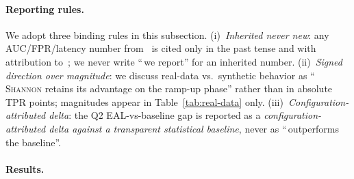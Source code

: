 \documentclass[runningheads]{llncs}
\begin{document}
\paragraph{Reporting rules.} We adopt three binding rules in this
subsection. (i)~\emph{Inherited never new}: any AUC/FPR/latency number
from~\cite{paper3} is cited only in the past tense and with attribution
to~\cite{paper3}; we never write ``\,we report'' for an inherited
number. (ii)~\emph{Signed direction over magnitude}: we discuss
real-data vs.\ synthetic behavior as
``\,\textsc{Shannon} retains its advantage on the ramp-up phase'' rather
than in absolute TPR points; magnitudes appear in
Table~\ref{tab:real-data} only. (iii)~\emph{Configuration-attributed
delta}: the Q2 EAL-vs-baseline gap is reported as a
\emph{configuration-attributed delta against a transparent statistical
baseline}, never as ``\,outperforms the baseline''.

\paragraph{Results.}
\begin{table}[t]
\centering
\caption{Real-data evaluation on the CIC-IDS2017-aligned proxy stream.
Each row is one $(E, W, s)$ EAL configuration or one z-score baseline
feature. Detection delay is measured from the first attack-labelled
second; ``miss'' marks configurations that never fire after that point.
The table is auto-generated by
\texttt{scripts/build\_table\_and\_pareto.py} from the
run JSONs and is regenerated unchanged when the proxy parquet is
replaced by the real CIC-IDS2017 CSV.}
\label{tab:real-data}
\scriptsize
{}
\end{table}
\end{document}
